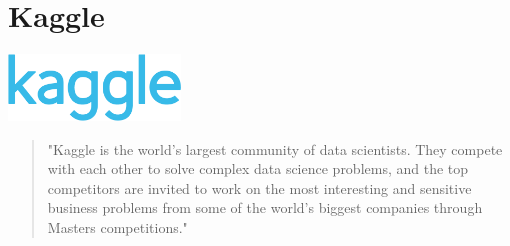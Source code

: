 \section{Kaggle}
	\begin{frame}

		\begin{center}
			\includegraphics[width=130pt]{images/Kaggle_logo}	
	
			\begin{quote}
				"Kaggle is the world's largest community of data 
				scientists.	They compete with each other to solve 
				complex data science problems, and the top competitors 
				are invited to work on the most interesting and sensitive business
				problems from some of the world’s biggest companies through Masters 
				competitions." 
				\cite{kagglePage}
			\end{quote}
			
		\end{center}
		
	\end{frame}